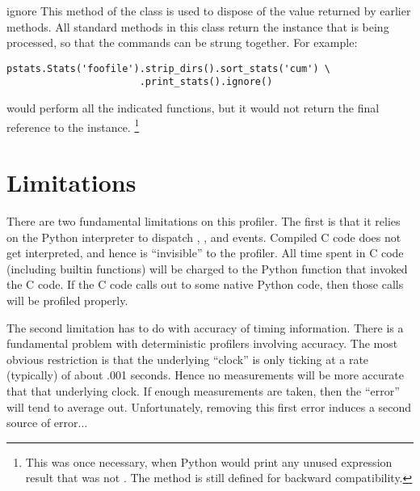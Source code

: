 \begin{funcdesc}{ignore}{}
This method of the  class is used to dispose of the value
returned by earlier methods.  All standard methods in this class
return the instance that is being processed, so that the commands can
be strung together.  For example:

\bcode\begin{verbatim}
pstats.Stats('foofile').strip_dirs().sort_stats('cum') \
                       .print_stats().ignore()
\end{verbatim}\ecode
%
would perform all the indicated functions, but it would not return
the final reference to the \code{Stats} instance.%
\footnote{
This was once necessary, when Python would print any unused expression
result that was not \code{None}.  The method is still defined for
backward compatibility.
}
\end{funcdesc}


\section{Limitations}

There are two fundamental limitations on this profiler.  The first is
that it relies on the Python interpreter to dispatch \dfn{call},
\dfn{return}, and \dfn{exception} events.  Compiled C code does not
get interpreted, and hence is ``invisible'' to the profiler.  All time
spent in C code (including builtin functions) will be charged to the
Python function that invoked the C code.  If the C code calls out
to some native Python code, then those calls will be profiled
properly.

The second limitation has to do with accuracy of timing information.
There is a fundamental problem with deterministic profilers involving
accuracy.  The most obvious restriction is that the underlying ``clock''
is only ticking at a rate (typically) of about .001 seconds.  Hence no
measurements will be more accurate that that underlying clock.  If
enough measurements are taken, then the ``error'' will tend to average
out. Unfortunately, removing this first error induces a second source
of error...

